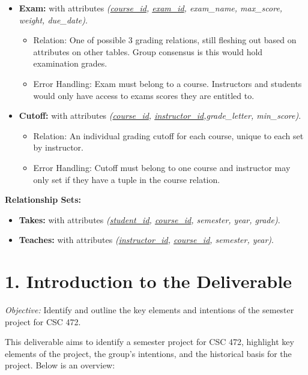 \documentclass[12pt]{article}
\begin{document}
\begin{itemize}
    \item \textbf{Exam:} with attributes \textit{(\underline{course\_id}, \underline{exam\_id}, exam\_name, max\_score, weight, due\_date)}.
    \begin{itemize}
        \item Relation: One of possible 3 grading relations, still fleshing out based on attributes on other tables. Group consensus is this would hold examination grades. 
        \item Error Handling: Exam must belong to a course. Instructors and students would only have access to exams scores they are entitled to. 
    \end{itemize} 
    
    \item \textbf{Cutoff:} with attributes \textit{(\underline{course\_id}, \underline{instructor\_id},grade\_letter, min\_score)}.
        \begin{itemize}
        \item Relation: An individual grading cutoff for each course, unique to each set by instructor. 
        \item Error Handling: Cutoff must belong to one course and instructor may only set if they have a tuple in the course relation.  
    \end{itemize} 
    
\end{itemize}
\textbf{Relationship Sets:}
\begin{itemize}  
    \item \textbf{Takes:} with attributes \textit{(\underline{student\_id}, \underline{course\_id}, semester, year, grade)}.
    \item \textbf{Teaches:} with attributes \textit{(\underline{instructor\_id}, \underline{course\_id}, semester, year)}.
\end{itemize}

\pagebreak

\section*{1. Introduction to the Deliverable}

\noindent
\textit{Objective:} Identify and outline the key elements and intentions of the semester project for CSC 472.

\noindent
This deliverable aims to identify a semester project for CSC 472, highlight key elements of the project, the group’s intentions, and the historical basis for the project. Below is an overview:
\end{document}
